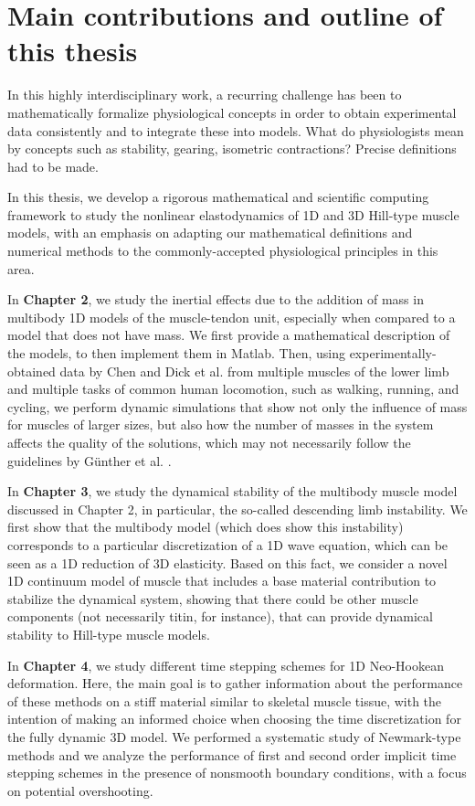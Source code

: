 \documentclass{sfuthesis}
\numberwithin{equation}{section}
\numberwithin{figure}{chapter}
\numberwithin{table}{chapter}
\theoremstyle{definition}
\begin{document}
\section{Main contributions and outline of this thesis}

In this highly interdisciplinary work, a recurring challenge has been to mathematically formalize physiological concepts in order to obtain experimental data consistently and to integrate these into models. What do physiologists mean by concepts such as stability, gearing, isometric contractions? Precise definitions had to be made.

In this thesis, we develop a rigorous mathematical and scientific computing framework to study the nonlinear elastodynamics of 1D and 3D Hill-type muscle models, with an emphasis on adapting our mathematical definitions and numerical methods to the commonly-accepted physiological principles in this area. 

In \textbf{Chapter 2}, we study the inertial effects due to the addition of mass in multibody 1D models of the muscle-tendon unit, especially when compared to a model that does not have mass. We first provide a mathematical description of the models, to then implement them in Matlab. Then, using experimentally-obtained data by Chen \cite{Evan} and Dick et al. \cite{Dick2016} from multiple muscles of the lower limb and multiple tasks of common human locomotion, such as walking, running, and cycling, we perform dynamic simulations that show not only the influence of mass for muscles of larger sizes, but also how the number of masses in the system affects the quality of the solutions, which may not necessarily follow the guidelines by G\"{u}nther et al. \cite{Gunther2012}.

In \textbf{Chapter 3}, we study the dynamical stability of the multibody muscle model discussed in Chapter 2, in particular, the so-called descending limb instability. We first show that the multibody model (which does show this instability) corresponds to a particular discretization of a 1D wave equation, which can be seen as a 1D reduction of 3D elasticity. Based on this fact, we consider a novel 1D continuum model of muscle that includes a base material contribution to stabilize the dynamical system, showing that there could be other muscle components (not necessarily titin, for instance), that can provide dynamical stability to Hill-type muscle models.

In \textbf{Chapter 4}, we study different time stepping schemes for 1D Neo-Hookean deformation. Here, the main goal is to gather information about the performance of these methods on a stiff material similar to skeletal muscle tissue, with the intention of making an informed choice when choosing the time discretization for the fully dynamic 3D model. We performed a systematic study of Newmark-type methods and we analyze the performance of first and second order implicit time stepping schemes in the presence of nonsmooth boundary conditions, with a focus on potential overshooting.
\end{document}
